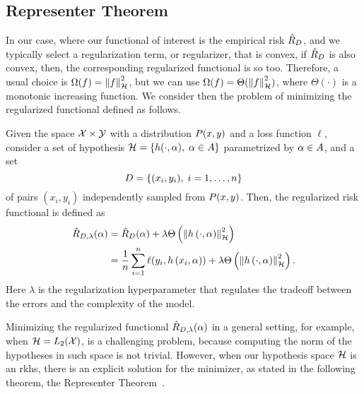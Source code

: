 \subsection{Representer Theorem} %
%
In our case, where our functional of interest is the empirical risk $\hat{R}_{D}$, and we typically select a regularization term, or regularizer, that is convex, if $\hat{R}_{D}$ is also convex, then, the corresponding regularized functional is so too. Therefore, a usual choice is $\Omega(f) = \left\lVert f\right\rVert^2_{\mathcal{H}}$, but we can use $\Omega(f) = \Theta(\left\lVert f\right\rVert_{\mathcal{H}}^2)$, where $\Theta(\cdot)$ is a monotonic increasing function.
We consider then the problem of minimizing the regularized functional defined as follows.
\begin{definition}
    Given the space $\mathcal{X} \times \mathcal{Y}$ with a distribution $P(x, y)$ and a loss function $\ell$, consider a set of hypothesis $\mathcal{H} = \left\{h(\cdot, \alpha),\; \alpha \in A\right\}$ parametrized by $\alpha \in A$, and a set 
    \begin{equation}
        \nonumber
        D = \left\{(x_i, y_i), \; i=1, \ldots, n\right\} 
    \end{equation}
    of pairs $(x_i, y_i)$ independently sampled from $P(x, y)$.   
    Then, the regularized risk functional is defined as
    \begin{equation}
        \label{eq:regrisk_def}
        \begin{aligned}
            \regrisk(\param) &= \emprisk(\param) + \lambda \Theta\left(\norm{\hyp{\cdot}{\param}}^2_\hypspace \right) \\
            &= \frac{1}{\nsamples} \sum_{i=1}^\nsamples \ell(y_i, \hyp{x_i}{\param}) + \lambda \Theta\left(\norm{\hyp{\cdot}{\param}}^2_\hypspace \right) .
        \end{aligned}        
    \end{equation}
    Here $\lambda$ is the regularization hyperparameter that regulates the tradeoff between the errors and the complexity of the model.
\end{definition}
%
Minimizing the regularized functional $\hat{R}_{D, \lambda}(\alpha)$ in a general setting, for example, when $\mathcal{H} = L_2(\mathcal{X})$, is a challenging problem, because computing the norm of the hypotheses in such space is not trivial.
%
However, when our hypothesis space $\mathcal{H}$ is an \acrshort{rkhs}, there is an explicit solution for the minimizer, as stated in the following theorem, the Representer Theorem~\citep{ScholkopfHS01}.
